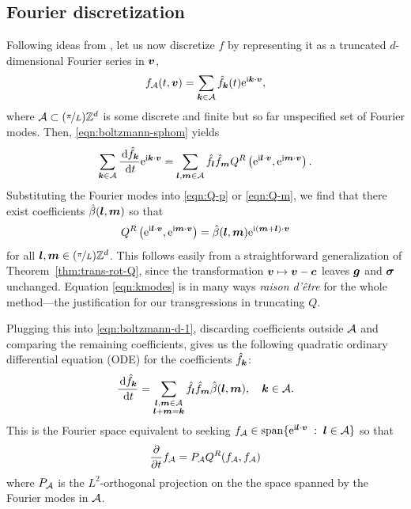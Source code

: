 \subsection{Fourier discretization} \label{sec:FourierDiscretization}

Following ideas from \cite{Gottlieb77, Canuto88}, let us now discretize $f$ by
representing it as a truncated $d$-dimensional Fourier series in ${\bm v}$, 
\begin{equation} \label{eqn:fn}
    f_{\mathcal{A}}(t,{\bm v}) = \sum_{{\bm k}\in\mathcal{A}} \hat{f}_{\bm k}(t) \mathrm{e}^{\mathrm{i}{\bm k}\cdot{\bm v}},
\end{equation}
where $\mathcal{A}\subset(\nicefrac{\pi}{L})\mathbb{Z}^d$ is some discrete and finite but so far
unspecified set of Fourier modes. Then, \eqref{eqn:boltzmann-sphom} yields
\begin{equation} \label{eqn:boltzmann-d-1}
    \sum_{{\bm k}\in\mathcal{A}} \frac{\,\mathrm{d} \hat{f}_{\bm k}}{\,\mathrm{d} t} \mathrm{e}^{\mathrm{i}{\bm k}\cdot {\bm v}} = \sum_{{\bm l},{\bm m}\in\mathcal{A}}
            \hat{f}_{\bm l}\hat{f}_{\bm m} Q^R\left(\mathrm{e}^{\mathrm{i}{\bm l}\cdot {\bm v}},
            \mathrm{e}^{\mathrm{i}{\bm m}\cdot {\bm v}}\right).
\end{equation}
Substituting the Fourier modes into \eqref{eqn:Q-p} or \eqref{eqn:Q-m}, we find
that there exist coefficients $\hat{\beta}({\bm l},{\bm m})$ so that
\begin{equation} \label{eqn:kmodes}
    Q^R\left(\mathrm{e}^{\mathrm{i}{\bm l}\cdot {\bm v}},\mathrm{e}^{\mathrm{i}{\bm m}\cdot {\bm v}}\right) = 
            \hat{\beta}({\bm l},{\bm m})\mathrm{e}^{\mathrm{i}({\bm m}+{\bm l})\cdot {\bm v}}
\end{equation}
for all ${\bm l},{\bm m} \in (\nicefrac{\pi}{L})\mathbb{Z}^d$. This follows easily from a straightforward generalization of
Theorem~\ref{thm:trans-rot-Q}, since the transformation ${\bm v} \mapsto {\bm v}-{\bm c}$ leaves ${\bm g}$ and ${\bm\sigma}$
unchanged. Equation \eqref{eqn:kmodes} is in many ways {\em raison d'\^{e}tre} for the whole method---the
justification for our transgressions in truncating $Q$.

Plugging this into \eqref{eqn:boltzmann-d-1}, discarding coefficients outside
$\mathcal{A}$ and comparing the remaining coefficients, gives us the following quadratic
ordinary differential equation (ODE) for the coefficients $\hat{f}_{\bm k}$:
\begin{equation} \label{eqn:boltzmann-d}
    \frac{\,\mathrm{d} \hat{f}_{\bm k}}{\,\mathrm{d} t} = \sum_{\substack{{\bm l},{\bm m}\in\mathcal{A} \\
    {\bm l}+{\bm m}={\bm k}}} \hat{f}_{\bm l}\hat{f}_{\bm m}\hat{\beta}({\bm l},{\bm m}),\quad {\bm k}\in \mathcal{A}.
\end{equation}
This is the Fourier space equivalent to seeking $f_{\mathcal{A}} \in \operatorname{span} \{ \mathrm{e}^{\mathrm{i}{\bm l}\cdot{\bm v}} \;:\; {\bm l}\in\mathcal{A} \}$
so that
\begin{equation} \label{eqn:boltzmann-nd}
  \frac{\partial}{\partial t} {f}_{\mathcal{A}} = P_{\mathcal{A}} Q^R(f_{\mathcal{A}},f_{\mathcal{A}})
\end{equation}
where $P_{\mathcal{A}}$ is the $L^2$-orthogonal projection on the the space spanned by the Fourier modes in $\mathcal{A}$.

